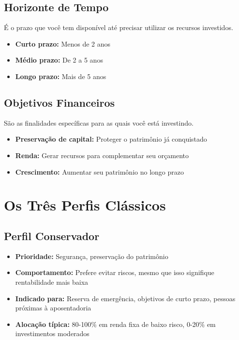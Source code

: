 \subsection{Horizonte de Tempo}
\noindent É o prazo que você tem disponível até precisar utilizar os recursos investidos.

\begin{itemize}[leftmargin=*]
    \item \textbf{Curto prazo:} Menos de 2 anos
    \item \textbf{Médio prazo:} De 2 a 5 anos
    \item \textbf{Longo prazo:} Mais de 5 anos
\end{itemize}

\subsection{Objetivos Financeiros}
\noindent São as finalidades específicas para as quais você está investindo.

\begin{itemize}[leftmargin=*]
    \item \textbf{Preservação de capital:} Proteger o patrimônio já conquistado
    \item \textbf{Renda:} Gerar recursos para complementar seu orçamento
    \item \textbf{Crescimento:} Aumentar seu patrimônio no longo prazo
\end{itemize}

\section{Os Três Perfis Clássicos}

\subsection{Perfil Conservador}
\begin{itemize}[leftmargin=*]
    \item \textbf{Prioridade:} Segurança, preservação do patrimônio
    \item \textbf{Comportamento:} Prefere evitar riscos, mesmo que isso signifique rentabilidade mais baixa
    \item \textbf{Indicado para:} Reserva de emergência, objetivos de curto prazo, pessoas próximas à aposentadoria
    \item \textbf{Alocação típica:} 80-100\% em renda fixa de baixo risco, 0-20\% em investimentos moderados
\end{itemize}

